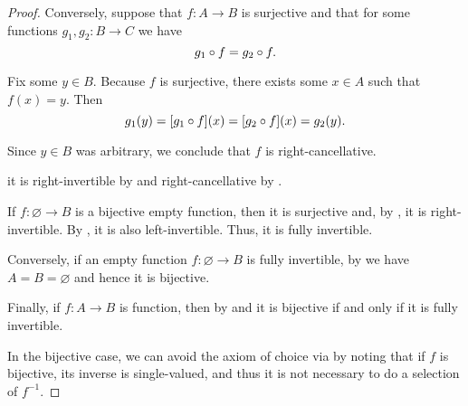 \begin{proof}
  Conversely, suppose that \( f: A \to B \) is surjective and that for some functions \( g_1, g_2: B \to C \) we have
  \begin{equation*}
    g_1 \bincirc f = g_2 \bincirc f.
  \end{equation*}

  Fix some \( y \in B \). Because \( f \) is surjective, there exists some \( x \in A \) such that \( f(x) = y \). Then
  \begin{equation*}
    g_1(y) = [g_1 \bincirc f](x) = [g_2 \bincirc f](x) = g_2(y).
  \end{equation*}

  Since \( y \in B \) was arbitrary, we conclude that \( f \) is right-cancellative.

  it is right-invertible by  and right-cancellative by .


  \SufficiencySubProof* If \( f: \varnothing \to B \) is a bijective empty function, then it is surjective and, by , it is right-invertible. By , it is also left-invertible. Thus, it is fully invertible.

  \NecessitySubProof* Conversely, if an empty function \( f: \varnothing \to B \) is fully invertible, by  we have \( A = B = \varnothing \) and hence it is bijective.

  Finally, if \( f: A \to B \) is  function, then by  and  it is bijective if and only if it is fully invertible.

  In the bijective case, we can avoid the axiom of choice via  by noting that if \( f \) is bijective, its inverse is single-valued, and thus it is not necessary to do a selection of \( f^{-1} \).
\end{proof}

